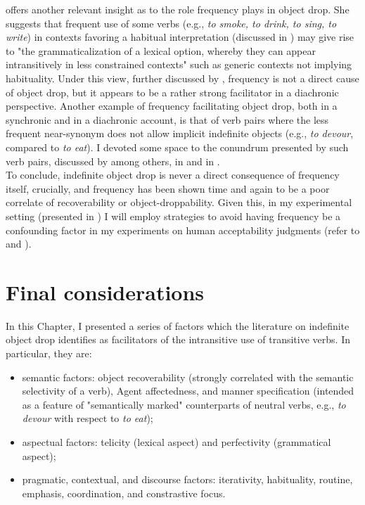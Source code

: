 \textcite{Goldberg2005a} offers another relevant insight as to the role frequency plays in object drop. She suggests that frequent use of some verbs (e.g., \textit{to smoke, to drink, to sing, to write}) in contexts favoring a habitual interpretation (discussed in ) may give rise to "the grammaticalization of a lexical option, whereby they can appear intransitively in less constrained contexts" such as generic contexts not implying habituality. Under this view, further discussed by \textcite[65]{Lorenzetti2008}, frequency is not a direct cause of object drop, but it appears to be a rather strong facilitator in a diachronic perspective. Another example of frequency facilitating object drop, both in a synchronic and in a diachronic account, is that of verb pairs where the less frequent near-synonym does not allow implicit indefinite objects (e.g., \textit{to devour}, compared to \textit{to eat}). I devoted some space to the conundrum presented by such verb pairs, discussed by \textcite{Glass2020, Goldberg2005a, Lorenzetti2008} among others, in  and in .\\
To conclude, indefinite object drop is never a direct consequence of frequency itself, crucially, and frequency has been shown time and again to be a poor correlate of recoverability or object-droppability. Given this, in my experimental setting (presented in ) I will employ strategies to avoid having frequency be a confounding factor in my experiments on human acceptability judgments (refer to  and ).

\section{Final considerations} 
In this Chapter, I presented a series of factors which the literature on indefinite object drop identifies as facilitators of the intransitive use of transitive verbs. In particular, they are:
\begin{itemize}
    \item semantic factors: object recoverability (strongly correlated with the semantic selectivity of a verb), Agent affectedness, and manner specification (intended as a feature of "semantically marked" counterparts of neutral verbs, e.g., \textit{to devour} with respect to \textit{to eat});
    \item aspectual factors: telicity (lexical aspect) and perfectivity (grammatical aspect);
    \item pragmatic, contextual, and discourse factors: iterativity, habituality, routine, emphasis, coordination, and constrastive focus.
\end{itemize}

